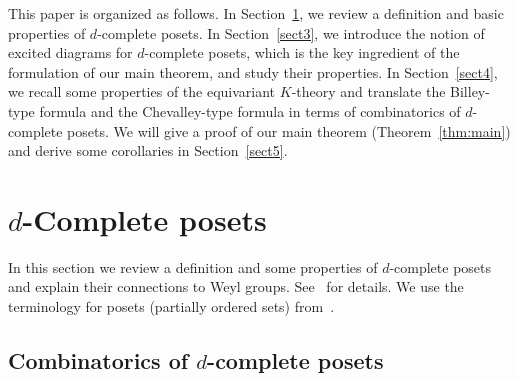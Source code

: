 \documentclass[ALCO,ThmDefs,Unicode,epreuves]{cedram}
\begin{document}
This paper is organized as follows.
In Section~\ref{sect2}, we review a definition and basic properties of $d$-complete posets.
In Section~\ref{sect3}, we introduce the notion of excited diagrams for $d$-complete posets, 
which is the key ingredient of the formulation of our main theorem, and study their properties.
In Section~\ref{sect4}, we recall some properties of the equivariant $K$-theory 
and translate the Billey-type formula and the Chevalley-type formula in terms of combinatorics 
of $d$-complete posets.
We will give a proof of our main theorem (Theorem~\ref{thm:main}) and derive some corollaries 
in Section~\ref{sect5}.


\section{%
\texorpdfstring{$d$}{d}-Complete posets
}\label{sect2}

In this section we review a definition and some properties of $d$-complete posets 
and explain their connections to Weyl groups.
See~\cite{Proc1, Proc2, Proc3, Stem2} for details.
We use the terminology for posets (partially ordered sets) 
from~\cite[Chapter~3]{Stan3}.

\subsection{%
Combinatorics of \texorpdfstring{$d$}{d}-complete posets
}
\end{document}
